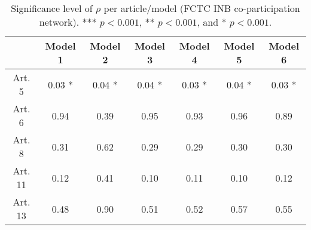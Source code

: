 \begin{table}[ht]
\centering
\begin{tabular}{ccccccc}
  \toprule
 & Model 1 & Model 2 & Model 3 & Model 4 & Model 5 & Model 6 \\ 
  \midrule
Art. 5 & 0.03 * & 0.04 * & 0.04 * & 0.03 * & 0.04 * & 0.03 * \\ 
   \midrule
Art. 6 & 0.94   & 0.39   & 0.95   & 0.93   & 0.96   & 0.89   \\ 
   \midrule
Art. 8 & 0.31   & 0.62   & 0.29   & 0.29   & 0.30   & 0.30   \\ 
   \midrule
Art. 11 & 0.12   & 0.41   & 0.10   & 0.11   & 0.10   & 0.12   \\ 
   \midrule
Art. 13 & 0.48   & 0.90   & 0.51   & 0.52   & 0.57   & 0.55   \\ 
   \bottomrule
\end{tabular}
\caption{Significance level of $\rho$ per article/model (FCTC INB co-participation network). *** $p < 0.001$, ** $p < 0.001$, and * $p < 0.001$.} 
\end{table}
